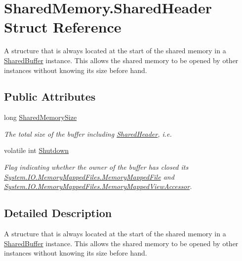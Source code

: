 \hypertarget{struct_shared_memory_1_1_shared_header}{}\section{Shared\+Memory.\+Shared\+Header Struct Reference}
\label{struct_shared_memory_1_1_shared_header}


A structure that is always located at the start of the shared memory in a \hyperlink{class_shared_memory_1_1_shared_buffer}{Shared\+Buffer} instance. This allows the shared memory to be opened by other instances without knowing its size before hand.  


\subsection*{Public Attributes}
\begin{DoxyCompactItemize}
\item 
long \hyperlink{struct_shared_memory_1_1_shared_header_abc3cc4a636cd2a69034692a0efb6f264}{Shared\+Memory\+Size}
\begin{DoxyCompactList}\small\item\em The total size of the buffer including \hyperlink{struct_shared_memory_1_1_shared_header}{Shared\+Header}, i.\+e. \end{DoxyCompactList}\item 
volatile int \hyperlink{struct_shared_memory_1_1_shared_header_a322c651d49080ce9021fed3e79aeee5b}{Shutdown}
\begin{DoxyCompactList}\small\item\em Flag indicating whether the owner of the buffer has closed its \hyperlink{class_system_1_1_i_o_1_1_memory_mapped_files_1_1_memory_mapped_file}{System.\+I\+O.\+Memory\+Mapped\+Files.\+Memory\+Mapped\+File} and \hyperlink{class_system_1_1_i_o_1_1_memory_mapped_files_1_1_memory_mapped_view_accessor}{System.\+I\+O.\+Memory\+Mapped\+Files.\+Memory\+Mapped\+View\+Accessor}. \end{DoxyCompactList}\end{DoxyCompactItemize}


\subsection{Detailed Description}
A structure that is always located at the start of the shared memory in a \hyperlink{class_shared_memory_1_1_shared_buffer}{Shared\+Buffer} instance. This allows the shared memory to be opened by other instances without knowing its size before hand. 

